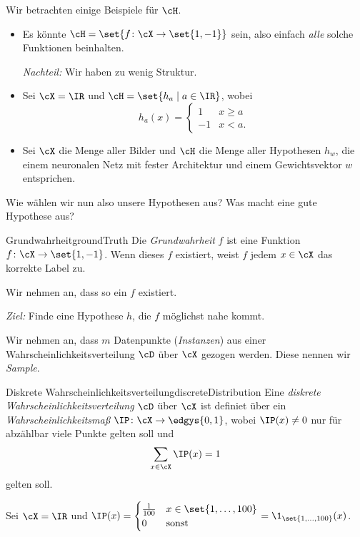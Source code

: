 \documentclass[language=ngerman,algolist,acrolist]{TemplateLecture}
\begin{document}
\begin{expl}
    Wir betrachten einige Beispiele für $\cH$.
    \begin{itemize}
        \item Es könnte $\cH = \set{f \colon \cX \to \set{1,-1}}$ sein, also einfach \emph{alle} solche Funktionen beinhalten. 
        
        \emph{Nachteil:} Wir haben zu wenig Struktur.
        \item Sei $\cX = \IR$ und $\cH = \set{h_a \mid a \in \IR}$, wobei 
        \begin{equation*}
            h_a(x) = \begin{cases}
            1 & x \geq a \\
            -1 & x < a.
        \end{cases}
        \end{equation*}
        \item Sei $\cX$ die Menge aller Bilder und $\cH$ die Menge aller Hypothesen $h_w$, die einem neuronalen Netz mit fester Architektur und einem Gewichtsvektor $w$ entsprichen.
    \end{itemize}
\end{expl}

Wie wählen wir nun also unsere Hypothesen aus? Was macht eine gute Hypothese aus?

\begin{defi}{Grundwahrheit}{groundTruth}
    Die \emph{Grundwahrheit} $f$ ist eine Funktion $f \colon \cX \to \set{1, -1}$. Wenn dieses $f$ existiert, weist $f$ jedem $x \in \cX$ das korrekte Label zu.
\end{defi}
Wir nehmen an, dass so ein $f$ existiert. 

\emph{Ziel:} Finde eine Hypothese $h$, die $f$ möglichst nahe kommt.

Wir nehmen an, dass $m$ Datenpunkte (\emph{Instanzen}) aus einer Wahrscheinlichkeitsverteilung $\cD$ über $\cX$ gezogen werden. Diese nennen wir \emph{Sample}.


\begin{defi}{Diskrete Wahrscheinlichkeitsverteilung}{discreteDistribution}
    Eine \emph{diskrete Wahrscheinlichkeitsverteilung} $\cD$ über $\cX$ ist definiet über ein \emph{Wahrscheinlichkeitsmaß} $\IP\colon \cX \to \edgys{0,1}$, wobei $\IP(x) \neq 0$ nur für abzählbar viele Punkte gelten soll und 
    \begin{equation*}
        \sum_{x \in \cX} \IP(x) = 1
    \end{equation*}
    gelten soll.
\end{defi}
\begin{expl}
    Sei $\cX = \IR$ und $\IP(x) = \begin{cases}
        \frac{1}{100} & x \in \set{1,\ldots,100} \\ 0 & \text{sonst}
    \end{cases} = \1_{\set{1,\ldots,100}}(x)$.
\end{expl}
\end{document}
